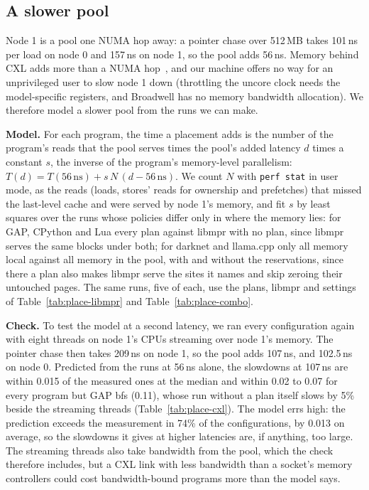 \documentclass[11pt]{article}
\newcommand{\tabref}[1]{Table~\ref{#1}}
\begin{document}
\subsection{A slower pool}
\label{sec:cxl}

Node 1 is a pool one NUMA hop away: a pointer chase over 512\,MB takes 101\,ns per load on node 0 and 157\,ns on node
1, so the pool adds 56\,ns. Memory behind CXL adds more than a NUMA hop~\cite{Li2023Pond}, and our machine offers no
way for an unprivileged user to slow node 1 down (throttling the uncore clock needs the model-specific registers, and
Broadwell has no memory bandwidth allocation). We therefore model a slower pool from the runs we can make.

\textbf{Model.} For each program, the time a placement adds is the number of the program's reads that the pool serves
times the pool's added latency $d$ times a constant $s$, the inverse of the program's memory-level parallelism:
$T(d) = T(56\,\mathrm{ns}) + s\,N\,(d - 56\,\mathrm{ns})$. We count $N$ with \texttt{perf stat} in user mode, as the
reads (loads, stores' reads for ownership and prefetches) that missed the last-level cache and were served by node 1's
memory, and fit $s$ by least squares over the runs whose policies differ only in where the memory lies: for GAP,
CPython and Lua every plan against libmpr with no plan, since libmpr serves the same blocks under both; for darknet
and llama.cpp only all memory local against all memory in the pool, with and without the reservations, since there a
plan also makes libmpr serve the sites it names and skip zeroing their untouched pages. The same runs, five of each,
use the plans, libmpr and settings of \tabref{tab:place-libmpr} and \tabref{tab:place-combo}.

\textbf{Check.} To test the model at a second latency, we ran every configuration again with eight threads on node 1's
CPUs streaming over node 1's memory. The pointer chase then takes 209\,ns on node 1, so the pool adds 107\,ns, and
102.5\,ns on node 0. Predicted from the runs at 56\,ns alone, the slowdowns at 107\,ns are within 0.015 of the measured
ones at the median and within 0.02 to 0.07 for every program but GAP bfs (0.11), whose run without a plan itself slows
by 5\% beside the streaming threads (\tabref{tab:place-cxl}). The model errs high: the prediction exceeds the
measurement in 74\% of the configurations, by 0.013 on average, so the slowdowns it gives at higher latencies are, if
anything, too large. The streaming threads also take bandwidth from the pool, which the check therefore includes, but
a CXL link with less bandwidth than a socket's memory controllers could cost bandwidth-bound programs more than the
model says.
\end{document}
